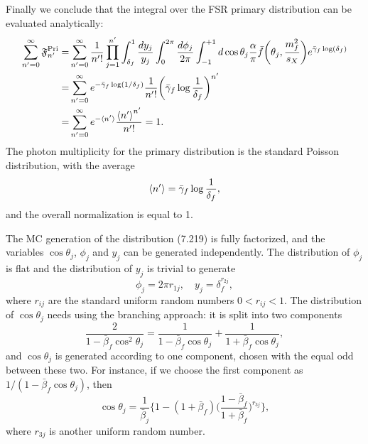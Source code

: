 Finally we conclude that the integral over the FSR primary distribution can be evaluated analytically:
\begin{align}
\sum_{n'=0}^{\infty}\mathfrak{F}^\text{Pri}_{n'}=&\sum_{n'=0}^{\infty}\frac{1}{n'!}\prod_{j=1}^{n'}\int_{\delta_f}^{1}\frac{dy_j}{y_j}\int_{0}^{2\pi}\frac{d\phi_j}{2\pi}\int_{-1}^{+1}d\cos\theta_j\frac{\alpha}{\pi}\bar{f}\biggl(\theta_j,\frac{m^2_f}{s_X}\biggr)e^{\bar{\gamma}_f\log(\delta_f)}\nonumber\\
=&\sum_{n'=0}^{\infty}e^{-\bar{\gamma}_f\log(1/\delta_f)}\frac{1}{n'!}\biggl(\bar{\gamma}_f\log\frac{1}{\delta_f}\biggr)^{n'}\nonumber\\
=&\sum_{n'=0}^{\infty}e^{-\braket{n'}}\frac{\braket{n'}^{n'}}{n'!}=1.
\end{align}
The photon multiplicity for the primary distribution is the standard Poisson distribution, with the average
\begin{equation}
\braket{n'}=\bar{\gamma}_f\log\frac{1}{\delta_f},
\end{equation}
and the overall normalization is equal to 1.

The MC generation of the distribution (7.219) is fully factorized, and the variables $\cos\theta_j$, $\phi_j$ and $y_j$ can be generated independently. The distribution of $\phi_j$ is flat and the distribution of $y_j$ is trivial to generate
\begin{equation}
\phi_j=2\pi r_{1j},\quad y_j=\delta^{r_{2j}}_f,
\end{equation}
where $r_{ij}$ are the standard uniform random numbers $0<r_{ij}<1$. The distribution of $\cos\theta_j$ needs using the branching approach: it is split into two components
\begin{equation}
\frac{2}{1-\bar{\beta}_f\cos^2\theta_j}=\frac{1}{1-\bar{\beta}_f\cos\theta_j}+\frac{1}{1+\bar{\beta}_f\cos\theta_j},
\end{equation}
and $\cos\theta_j$ is generated according to one component, chosen with the equal odd between these two. For instance, if we choose the first component as $1/(1-\bar{\beta}_f\cos\theta_j)$, then
\begin{equation}
\cos\theta_j=\frac{1}{\bar{\beta}_j}\biggl\{ 1-(1+\bar{\beta}_f)\biggl(\frac{1-\bar{\beta}_f}{1+\bar{\beta}_f}\biggr)^{r_{3j}} \biggr\},
\end{equation}
where $r_{3j}$ is another uniform random number.

